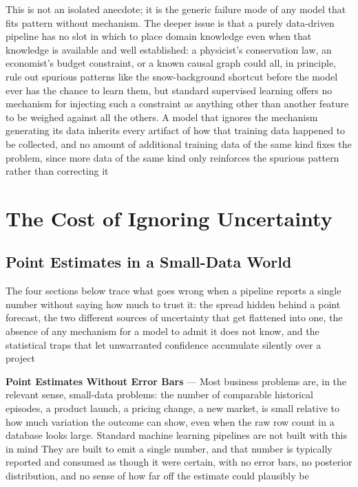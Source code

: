 This is not an isolated anecdote; it is the generic failure mode of any model
that fits pattern without mechanism. The deeper issue is that a purely data-driven
pipeline has no slot in which to place domain knowledge even when that knowledge
is available and well established: a physicist's conservation law, an economist's
budget constraint, or a known causal graph could all, in principle, rule out
spurious patterns like the snow-background shortcut before the model ever has
the chance to learn them, but standard supervised learning offers no mechanism for
injecting such a constraint as anything other than another feature to be weighed
against all the others. A model that ignores the mechanism generating its data
inherits every artifact of how that training data happened to be collected, and no
amount of additional training data of the same kind fixes the problem, since
more data of the same kind only reinforces the spurious pattern rather than
correcting it

\section{The Cost of Ignoring Uncertainty}
\label{chap:cost-ignoring-uncertainty}

\subsection{Point Estimates in a Small-Data World}
\label{sec:point-estimates-small-data}

The four sections below trace what goes wrong when a pipeline reports a single number
without saying how much to trust it: the spread hidden behind a point forecast, the
two different sources of uncertainty that get flattened into one, the absence of
any mechanism for a model to admit it does not know, and the statistical traps that
let unwarranted confidence accumulate silently over a project

\textbf{Point Estimates Without Error Bars} --- Most business problems are, in
the relevant sense, small-data problems: the number of comparable historical
episodes, a product launch, a pricing change, a new market, is small relative to
how much variation the outcome can show, even when the raw row count in a database
looks large. Standard machine learning pipelines are not built with this in mind
They are built to emit a single number, and that number is typically reported
and consumed as though it were certain, with no error bars, no posterior
distribution, and no sense of how far off the estimate could plausibly be


